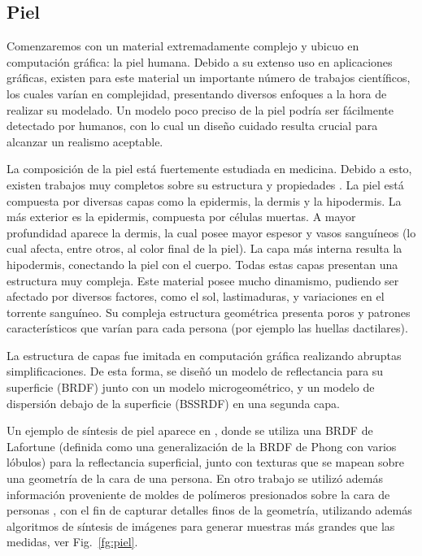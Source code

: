 \subsection{Piel}
Comenzaremos con un material extremadamente complejo y ubicuo en computación gráfica: la piel humana.
Debido a su extenso uso en aplicaciones gráficas, existen para este material un importante número de trabajos científicos, los cuales varían en complejidad, presentando diversos enfoques a la hora de realizar su modelado.
Un modelo poco preciso de la piel podría ser fácilmente detectado por humanos, con lo cual un diseño cuidado resulta crucial para alcanzar un realismo aceptable.


La composición de la piel está fuertemente estudiada en medicina.
Debido a esto, existen trabajos muy completos sobre su estructura y propiedades \cite{Walters2002}.
La piel está compuesta por diversas capas como la epidermis, la dermis y la hipodermis.
La más exterior es la epidermis, compuesta por células muertas.
A mayor profundidad aparece la dermis, la cual posee mayor espesor y vasos sanguíneos (lo cual afecta, entre otros, al color final de la piel).
La capa más interna resulta la hipodermis, conectando la piel con el cuerpo.
Todas estas capas presentan una estructura muy compleja.
Este material posee mucho dinamismo, pudiendo ser afectado por diversos factores, como el sol, lastimaduras, y variaciones en el torrente sanguíneo.
Su compleja estructura geométrica presenta poros y patrones característicos que varían para cada persona (por ejemplo las huellas dactilares).

La estructura de capas fue imitada en computación gráfica realizando abruptas simplificaciones.
De esta forma, se diseñó un modelo de reflectancia para su superficie (BRDF) junto con un modelo microgeométrico, y un modelo de dispersión debajo de la superficie (\acrshort{BSSRDF}) en una segunda capa.

Un ejemplo de síntesis de piel aparece en \cite{Marschner2000}, donde se utiliza una BRDF de Lafortune (definida como una generalización de la BRDF de Phong con varios lóbulos) para la reflectancia superficial, junto con texturas que se mapean sobre una geometría de la cara de una persona.
En otro trabajo se utilizó además información proveniente de moldes de polímeros presionados sobre la cara de personas \cite{Haro2001}, con el fin de capturar detalles finos de la geometría, utilizando además algoritmos de síntesis de imágenes para generar muestras más grandes que las medidas, ver Fig.~\ref{fg:piel}.

